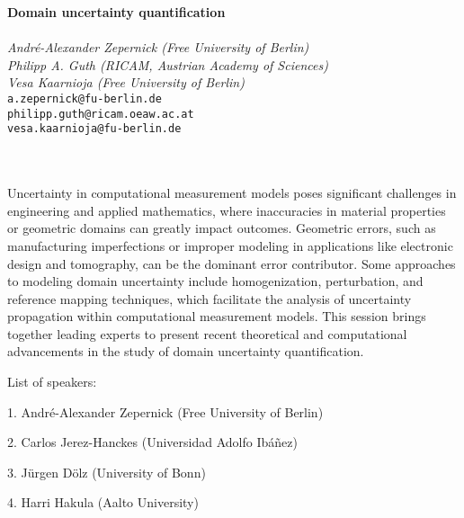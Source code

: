 \documentclass[12pt,a4paper,figuresright]{book}
\newenvironment{session}[7] %
 {%
  \vskip 0pt\nopagebreak%
  \textbf{#1}\vspace{3mm}\\\nopagebreak%
  \ifthenelse{\equal{#5}{ }}{Organizer:}{Organizers:}\vspace{2mm}\\\nopagebreak%
  \textit{#2}\\\nopagebreak%
  #3\\\nopagebreak%
  \url{#4}\vspace{3mm}\\\nopagebreak%
  \ifthenelse{\equal{#5}{ }}{}{\textit{#5}\\\nopagebreak%
                              #6\\\nopagebreak%
                              \url{#7}\vspace{3mm}\\\nopagebreak}%
  \quad\\\nopagebreak%
 }
 {\nopagebreak}%
\begin{document}
\begin{session}
  {Domain uncertainty quantification}%
  {Andr\'e-Alexander Zepernick {\rm (Free University of Berlin)}\\
  Philipp A. Guth {\rm (RICAM, Austrian Academy of Sciences)}\\ Vesa Kaarnioja {\rm (Free University of Berlin)}}%
  {{\tt a.zepernick@fu-berlin.de}\\{\tt philipp.guth@ricam.oeaw.ac.at}\\{\tt vesa.kaarnioja@fu-berlin.de}}%
  {}%
  {}%
  {}%
  {}%

Uncertainty in computational measurement models poses significant challenges in engineering and applied mathematics, where inaccuracies in material properties or geometric domains can greatly impact outcomes. Geometric errors, such as manufacturing imperfections or improper modeling in applications like electronic design and tomography, can be the dominant error contributor. Some approaches to modeling domain uncertainty include homogenization, perturbation, and reference mapping techniques, which facilitate the analysis of uncertainty propagation within computational measurement models. This session brings together leading experts to present recent theoretical and computational advancements in the study of domain uncertainty quantification.

List of speakers:

1. Andr\'e-Alexander Zepernick (Free University of Berlin)

2. Carlos Jerez-Hanckes (Universidad Adolfo Ib\'{a}\~{n}ez)

3. J\"urgen D\"olz (University of Bonn)

4. Harri Hakula (Aalto University)

\end{session}
\end{document}
